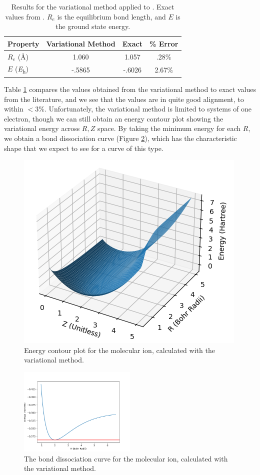 \documentclass[journal=jacsat,manuscript=communication]{achemso}
\begin{document}
{\setlength{\extrarowheight}{2pt}
\begin{table}[H]
  \begin{tabular}{l|ccc}
    Property & Variational Method & Exact & \% Error \\
    \hline
    $R_e$ (\si{\angstrom}) & 1.060 & 1.057 & .28\%\\
    $E$ (\si{\hartree}) & -.5865 & -.6026 & 2.67\%
  \end{tabular}
  \caption{Results for the variational method applied to .  Exact values from \citet{morgensternUnderstandingQuantumMechanical2023}.  $R_e$ is the equilibrium bond length, and $E$ is the ground state energy. }
  \label{tab:var}
\end{table}

Table \ref{tab:var} compares the values obtained from the variational method to exact values from the literature, and we see that the values are in quite good alignment, to within $<3\%$. 
 Unfortunately, the variational method is limited to systems of one electron, though we can still obtain an energy contour plot showing the variational energy across $R,Z$ space.  By taking the minimum energy for each $R$, we obtain a bond dissociation curve (Figure \ref{fig:var_bd}), which has the characteristic shape that we expect to see for a curve of this type\cite{atkinsAtkinsPhysicalChemistry2018}.

\begin{figure}[H]
  \includegraphics[width=.5\textwidth]{figures/variational_energy_contour.png}
  \caption{Energy contour plot for the  molecular ion, calculated with the variational method.}
  \label{fig:contour}
\end{figure}



\begin{figure}[H]
  \includegraphics[width=0.5\textwidth]{figures/variational_dissociation.png}
  \caption{The bond dissociation curve for the  molecular ion, calculated with the variational method.}
  \label{fig:var_bd}
\end{figure}

}
\end{document}

